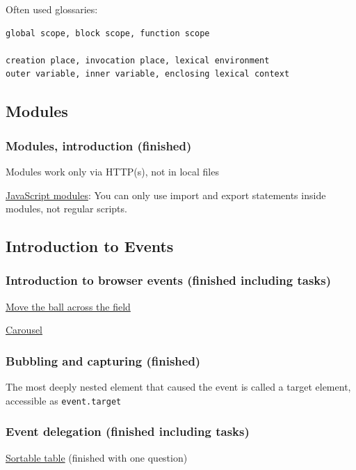 \documentclass[a4paper, 12pt]{article}
\begin{document}
\noindent Often used glossaries:
\begin{verbatim}
global scope, block scope, function scope

creation place, invocation place, lexical environment
outer variable, inner variable, enclosing lexical context
\end{verbatim}

\subsection{Modules}
\subsubsection{Modules, introduction (finished)}
Modules work only via HTTP(s), not in local files

\href{https://developer.mozilla.org/en-US/docs/Web/JavaScript/Guide/Modules}{JavaScript modules}: You can only use import and export statements inside modules, not regular scripts.

\subsection{Introduction to Events}
\subsubsection{Introduction to browser events (finished including tasks)}

\href{https://javascript.info/introduction-browser-events#move-the-ball-across-the-field}{Move the ball across the field}

\href{https://javascript.info/introduction-browser-events#carousel}{Carousel}

\subsubsection{Bubbling and capturing (finished)}
The most deeply nested element that caused the event is called a target element, accessible as \verb|event.target|

\subsubsection{Event delegation (finished including tasks)}

\href{https://javascript.info/event-delegation#sortable-table}{Sortable table} (finished with one question)
\end{document}
